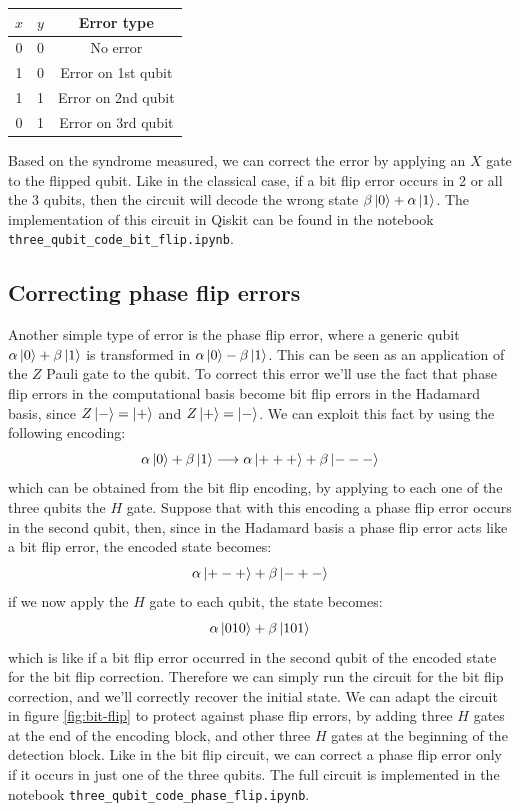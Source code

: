 \documentclass{article}
\begin{document}
	\begin{table}[H]
		\centering
		\begin{tabular}{|c|c|c|}
			\hline
			$x$ & $y$ & Error type \\
			\hline
			\hline
			0 & 0 & No error \\
			\hline
			1 & 0 & Error on 1st qubit\\
			\hline
			1 & 1 & Error on 2nd qubit \\
			\hline
			0 & 1 & Error on 3rd qubit \\
			\hline
		\end{tabular}
	\end{table}
	\noindent Based on the syndrome measured, we can correct the error by applying an $X$ gate to the flipped qubit. Like in the classical case, if a bit flip error occurs in 2 or all the 3 qubits, then the circuit will decode the wrong state $\beta\ket{0} + \alpha\ket{1}$. The implementation of this circuit in Qiskit can be found in the notebook \verb|three_qubit_code_bit_flip.ipynb|.
	 

	\subsection{Correcting phase flip errors}
	Another simple type of error is the phase flip error, where a generic qubit $\alpha \ket{0} + \beta\ket{1}$ is transformed in $\alpha\ket{0} - \beta\ket{1}$. This can be seen as an application of the $Z$ Pauli gate to the qubit. To correct this error we'll use the fact that phase flip errors in the computational basis become bit flip errors in the Hadamard basis, since $Z\ket{-} = \ket{+}$ and $Z\ket{+} = \ket{-}$. We can exploit this fact by using the following encoding:
	\[ \alpha\ket{0} + \beta\ket{1} \longrightarrow \alpha\ket{+++} + \beta\ket{---}\]
	which can be obtained from the bit flip encoding, by applying to each one of the three qubits the $H$ gate. Suppose that with this encoding a phase flip error occurs in the second qubit, then, since in the Hadamard basis a phase flip error acts like a bit flip error, the encoded state becomes:
	\[ \alpha\ket{+-+} + \beta\ket{-+-} \]
	if we now apply the $H$ gate to each qubit, the state becomes:
	\[ \alpha\ket{010} + \beta\ket{101} \]
	which is like if a bit flip error occurred in the second qubit of the encoded state for the bit flip correction. Therefore we can simply run the circuit for the bit flip correction, and we'll correctly recover the initial state. We can adapt the circuit in figure \ref{fig:bit-flip} to protect against phase flip errors, by adding three $H$ gates at the end of the encoding block, and other three $H$ gates at the beginning of the detection block. Like in the bit flip circuit, we can correct a phase flip error only if it occurs in just one of the three qubits. The full circuit is implemented in the notebook \verb|three_qubit_code_phase_flip.ipynb|.
	
\end{document}
